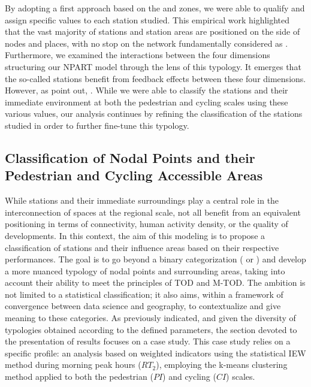\begin{refsegment}
By adopting a first approach based on the  and  zones, we were able to qualify and assign specific values to each station studied. This empirical work highlighted that the vast majority of stations and station areas are positioned on the side of  nodes and places, with no stop on the network fundamentally considered as . Furthermore, we examined the interactions between the four dimensions structuring our \acrshort{NPART} model through the lens of this typology. It emerges that the so-called  stations benefit from feedback effects between these four dimensions. However, as \textcolor{blue}{\textcite[4]{zhang_make_2023}} point out, . While we were able to classify the stations and their immediate environment at both the pedestrian and cycling scales using these various values, our analysis continues by refining the classification of the stations studied in order to further fine-tune this typology.%

\subsection{Classification of Nodal Points and their Pedestrian and Cycling Accessible Areas
    \label{chap6:results-classification-gares}
    }

While stations and their immediate surroundings play a central role in the interconnection of spaces at the regional scale, not all benefit from an equivalent positioning in terms of connectivity, human activity density, or the quality of developments. In this context, the aim of this modeling is to propose a classification of stations and their influence areas based on their respective performances. The goal is to go beyond a binary categorization ( or ) and develop a more nuanced typology of nodal points and surrounding areas, taking into account their ability to meet the principles of \acrshort{TOD} and \acrshort{M-TOD}. The ambition is not limited to a statistical classification; it also aims, within a framework of convergence between data science and geography, to contextualize and give meaning to these categories. As previously indicated, and given the diversity of typologies obtained according to the defined parameters, the section devoted to the presentation of results focuses on a case study. This case study relies on a specific profile: an analysis based on weighted indicators using the statistical \acrshort{IEW} method during morning peak hours (\(RT_{2}\)), employing the k-means clustering method applied to both the pedestrian (\(PI\)) and cycling (\(CI\)) scales.%


\end{refsegment}

